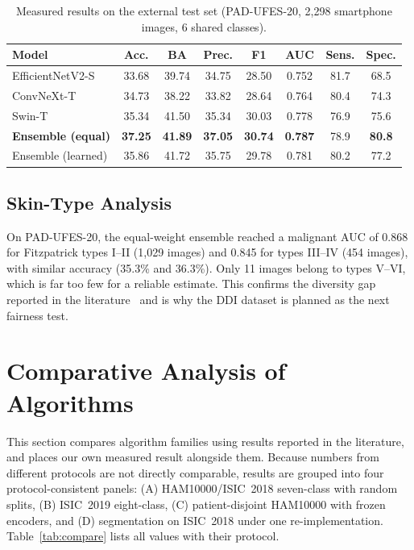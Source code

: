 \begin{table}[t]
\centering
\caption{Measured results on the external test set (PAD-UFES-20, 2{,}298
smartphone images, 6 shared classes).}
\label{tab:res_external}
\renewcommand{\arraystretch}{1.15}
\scriptsize
\setlength{\tabcolsep}{3pt}
\begin{tabular}{@{}l c c c c c c c@{}}
\toprule
\textbf{Model} & \textbf{Acc.} & \textbf{BA} & \textbf{Prec.} & \textbf{F1} & \textbf{AUC} & \textbf{Sens.} & \textbf{Spec.} \\
\midrule
EfficientNetV2-S & 33.68 & 39.74 & 34.75 & 28.50 & 0.752 & 81.7 & 68.5 \\
ConvNeXt-T & 34.73 & 38.22 & 33.82 & 28.64 & 0.764 & 80.4 & 74.3 \\
Swin-T & 35.34 & 41.50 & 35.34 & 30.03 & 0.778 & 76.9 & 75.6 \\
\textbf{Ensemble (equal)} & \textbf{37.25} & \textbf{41.89} & \textbf{37.05} & \textbf{30.74} & \textbf{0.787} & 78.9 & \textbf{80.8} \\
Ensemble (learned) & 35.86 & 41.72 & 35.75 & 29.78 & 0.781 & 80.2 & 77.2 \\
\bottomrule
\end{tabular}
\end{table}

\subsection{Skin-Type Analysis}
On PAD-UFES-20, the equal-weight ensemble reached a malignant AUC of
0.868 for Fitzpatrick types I--II (1{,}029 images) and 0.845 for types
III--IV (454 images), with similar accuracy (35.3\% and 36.3\%). Only 11
images belong to types V--VI, which is far too few for a reliable
estimate. This confirms the diversity gap reported in the
literature~\cite{wen2022} and is why the DDI dataset is planned as the
next fairness test.

\section{Comparative Analysis of Algorithms}\label{sec:compare}
This section compares algorithm families using results reported in the
literature, and places our own measured result alongside them. Because
numbers from different protocols are not directly comparable, results are grouped into four protocol-consistent panels:
(A) HAM10000/ISIC~2018 seven-class with random splits,
(B) ISIC~2019 eight-class, (C) patient-disjoint HAM10000 with frozen
encoders, and (D) segmentation on ISIC~2018 under one re-implementation.
Table~\ref{tab:compare} lists all values with their protocol.

